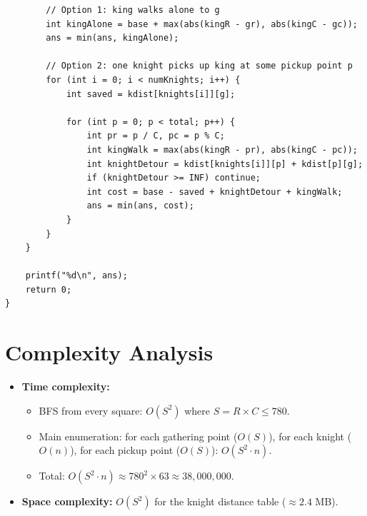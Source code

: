 \documentclass[11pt,a4paper]{article}
\begin{document}
\begin{lstlisting}
        // Option 1: king walks alone to g
        int kingAlone = base + max(abs(kingR - gr), abs(kingC - gc));
        ans = min(ans, kingAlone);

        // Option 2: one knight picks up king at some pickup point p
        for (int i = 0; i < numKnights; i++) {
            int saved = kdist[knights[i]][g];

            for (int p = 0; p < total; p++) {
                int pr = p / C, pc = p % C;
                int kingWalk = max(abs(kingR - pr), abs(kingC - pc));
                int knightDetour = kdist[knights[i]][p] + kdist[p][g];
                if (knightDetour >= INF) continue;
                int cost = base - saved + knightDetour + kingWalk;
                ans = min(ans, cost);
            }
        }
    }

    printf("%d\n", ans);
    return 0;
}
\end{lstlisting}

\section{Complexity Analysis}

\begin{itemize}
  \item \textbf{Time complexity:}
    \begin{itemize}
      \item BFS from every square: $O(S^2)$ where $S = R \times C \le 780$.
      \item Main enumeration: for each gathering point ($O(S)$), for each knight ($O(n)$),
            for each pickup point ($O(S)$): $O(S^2 \cdot n)$.
      \item Total: $O(S^2 \cdot n) \approx 780^2 \times 63 \approx 38{,}000{,}000$.
    \end{itemize}

  \item \textbf{Space complexity:} $O(S^2)$ for the knight distance table ($\approx 2.4$ MB).
\end{itemize}
\end{document}
